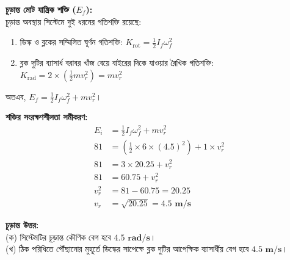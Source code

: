 \documentclass[12pt, a4paper]{article}
\begin{document}
\begin{tcolorbox}[solutionbox={সমাধান (Solution)}]
\textbf{চূড়ান্ত মোট যান্ত্রিক শক্তি ($E_f$):} \\
চূড়ান্ত অবস্থায় সিস্টেমে দুই ধরনের গতিশক্তি রয়েছে:
\begin{enumerate}[label=\roman*., leftmargin=*, parsep=0.5ex]
    \item ডিস্ক ও ব্লকের সম্মিলিত ঘূর্ণন গতিশক্তি: $K_{\text{rot}} = \frac{1}{2}I_f \omega_f^2$
    \item ব্লক দুটির ব্যাসার্ধ বরাবর খাঁজ বেয়ে বাইরের দিকে যাওয়ার রৈখিক গতিশক্তি: $K_{\text{rad}} = 2 \times \left( \frac{1}{2} m v_r^2 \right) = m v_r^2$
\end{enumerate}
অতএব, $E_f = \frac{1}{2}I_f \omega_f^2 + m v_r^2$।

\textbf{শক্তির সংরক্ষণশীলতা সমীকরণ:}
\begin{align*}
    E_i &= \frac{1}{2}I_f \omega_f^2 + m v_r^2 \\
    81 &= \left( \frac{1}{2} \times 6 \times (4.5)^2 \right) + 1 \times v_r^2 \\
    81 &= 3 \times 20.25 + v_r^2 \\
    81 &= 60.75 + v_r^2 \\
    v_r^2 &= 81 - 60.75 = 20.25 \\
    v_r &= \sqrt{20.25} = \mathbf{4.5 \text{ m/s}}
\end{align*}

\vspace{1em}
\begin{tcolorbox}[answerbox]
\textbf{চূড়ান্ত উত্তর:} \\
(ক) সিস্টেমটির চূড়ান্ত কৌণিক বেগ হবে $\mathbf{4.5 \text{ rad/s}}$। \\
(খ) ঠিক পরিধিতে পৌঁছানোর মুহূর্তে ডিস্কের সাপেক্ষে ব্লক দুটির আপেক্ষিক ব্যাসার্ধীয় বেগ হবে $\mathbf{4.5 \text{ m/s}}$।
\end{tcolorbox}
\end{tcolorbox}
\end{document}
